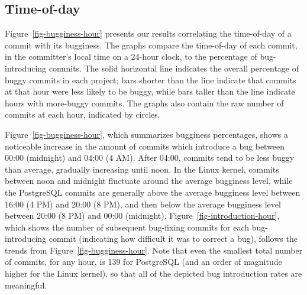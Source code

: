 \subsection{Time-of-day} 
\label{sec-time-of-day}

Figure~\ref{fig-bugginess-hour} presents our results correlating the time-of-day
of a commit with its bugginess. The graphs compare the time-of-day of each
commit, in the committer's local time on a 24-hour clock, to the percentage of
bug-introducing commits. The solid horizontal line
indicates the overall percentage of buggy commits in each project; bars
shorter than the line indicate that commits at that hour were less likely to be
buggy, while bars taller than the line indicate hours with more-buggy
commits. The graphs also contain the raw number of commits at each hour, 
indicated by circles.


Figure~\ref{fig-bugginess-hour}, which summarizes bugginess percentages, shows a
noticeable increase in the amount of commits which introduce a bug between 00:00
(midnight) and 04:00 (4 AM). After 04:00, commits tend to be less buggy than
average, gradually increasing until noon. In the Linux kernel, commits between
noon and midnight fluctuate around the average bugginess level, while the
PostgreSQL commits are generally above the average bugginess level between 16:00
(4 PM) and 20:00 (8 PM), and then below the average bugginess level between 20:00
(8 PM) and 00:00 (midnight). Figure~\ref{fig-introduction-hour}, which shows the
number of subsequent bug-fixing commits for each bug-introducing commit 
(indicating how difficult it was to correct a bug), follows the trends from
Figure~\ref{fig-bugginess-hour}. Note that even the smallest total number of
commits, for any hour, is 139 for PostgreSQL (and an order of magnitude higher
for the Linux kernel), so that all of the depicted bug introduction rates are
meaningful.

